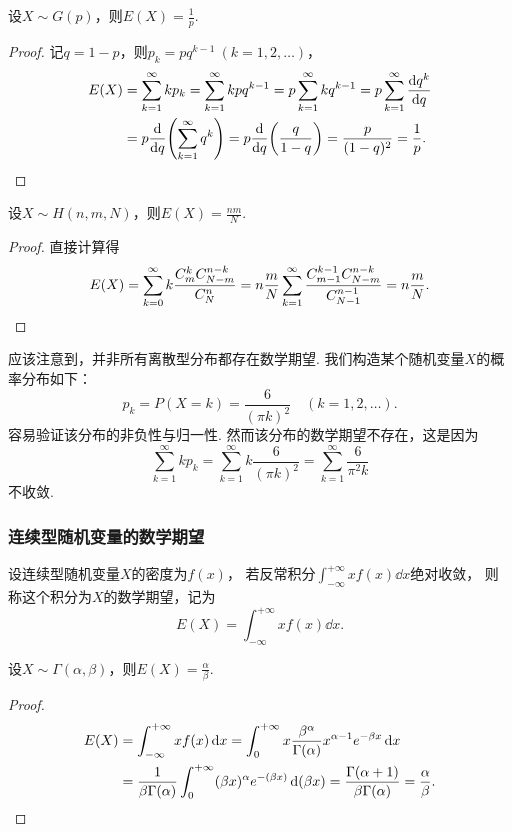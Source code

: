 \begin{theorem}\label{theorem:随机变量的数字特征.几何分布的数学期望}
设\(X \sim G(p)\)，则\(E(X) = \frac{1}{p}\).
\begin{proof}
\def\s{\sum\limits_{k=1}^\infty }%
记\(q = 1-p\)，则\(p_k = pq^{k-1}\ (k=1,2,\dotsc)\)，%
\begin{align*}
E(X) &= \s k p_k
= \s k p q^{k-1}
= p \s k q^{k-1}
= p \s \dv{q^k}{q} \\
&= p \dv{q}(\s q^k)
= p \dv{q}(\frac{q}{1-q})
= \frac{p}{(1-q)^2}
= \frac{1}{p}.
\qedhere
\end{align*}
\end{proof}
\end{theorem}

\begin{theorem}
设\(X \sim H(n,m,N)\)，则\(E(X) = \frac{n m}{N}\).
\begin{proof}
\def\s#1{\sum\limits_{k=#1}^\infty }%
直接计算得\[
E(X) = \s0 k \frac{C_m^k C_{N-m}^{n-k}}{C_N^n}
= n \frac{m}{N} \s1 \frac{C_{m-1}^{k-1} C_{N-m}^{n-k}}{C_{N-1}^{n-1}}
= n \frac{m}{N}.
\qedhere
\]
\end{proof}
\end{theorem}

应该注意到，并非所有离散型分布都存在数学期望.
我们构造某个随机变量\(X\)的概率分布如下：\[
p_k = P(X=k) = \frac{6}{(\pi k)^2}
\quad(k=1,2,\dotsc).
\]容易验证该分布的非负性与归一性.
然而该分布的数学期望不存在，这是因为\[
\sum\limits_{k=1}^\infty k p_k
= \sum\limits_{k=1}^\infty k \frac{6}{(\pi k)^2}
= \sum\limits_{k=1}^\infty \frac{6}{\pi^2 k}
\]不收敛.

\subsubsection{连续型随机变量的数学期望}
\begin{definition}
设连续型随机变量\(X\)的密度为\(f(x)\)，%
若反常积分\(\int_{-\infty}^{+\infty} x f(x) \dd{x}\)绝对收敛，%
则称这个积分为\(X\)的数学期望，记为\[
E(X) = \int_{-\infty}^{+\infty} x f(x) \dd{x}.
\]
\end{definition}

\begin{theorem}\label{theorem:随机变量的数字特征.伽马分布的数学期望}
设\(X \sim \Gamma(\alpha,\beta)\)，则\(E(X)=\frac{\alpha}{\beta}\).
\begin{proof}
\begin{align*}
E(X)
&= \int_{-\infty}^{+\infty} x f(x) \dd{x}
= \int_0^{+\infty}{ x \frac{\beta^{\alpha}}{\Gamma(\alpha)} x^{\alpha-1} e^{-\beta x} \dd{x}} \\
&= \frac{1}{\beta \Gamma(\alpha)} \int_0^{+\infty} (\beta x)^{\alpha} e^{-(\beta x)} \dd(\beta x)
= \frac{\Gamma(\alpha + 1)}{\beta \Gamma(\alpha)}
= \frac{\alpha}{\beta}.
\qedhere
\end{align*}
\end{proof}
\end{theorem}


